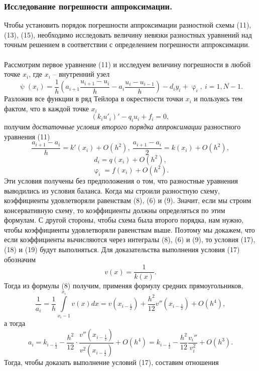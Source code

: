 \documentclass[a4paper, 12pt]{report}
\numberwithin{equation}{section}
\renewcommand{\varphi}{\upvarphi}
\renewcommand{\psi}{\uppsi}
\begin{document}
		\subsubsection{Исследование погрешности аппроксимации.}
		Чтобы установить порядок погрешности аппроксимации разностной схемы (11), (13), (15), необходимо исследовать величину невязки разностных уравнений над точным решением в соответствии с определением погрешности аппроксимации.\\\\
		Рассмотрим первое уравнение (11) и исследуем величину погрешности в любой точке $x_i$, где $x_i$ -- внутренний узел
		$$\psi(x_i) = 	\dfrac{1}{h}\left(a_{i+1}\dfrac{u_{i+1} - u_i}{h} - a_i \dfrac{u_i - u_{i-1}}{h}\right)-d_iy_i + \varphi_i,\ i = \overline {1, N-1}.$$
		Разложив все функции в ряд Тейлора в окрестности точки $x_i$ и пользуясь тем фактом, что в каждой точке $x_i$
		$$(k_i u'_i)' - q_i u_i + f_i = 0,$$
		получим \textit{достаточные условия второго порядка аппроксимации} разностного уравнения (11)
		\begin{equation}
			\dfrac{a_{i+1} - a_i}{h} = k'(x_i) + O(h^2),\ \dfrac{a_{i+1} - a_i}{2} = k(x_i) + O(h^2),
		\end{equation}
		\begin{equation}
			d_i = q(x_i) + O(h^2),
		\end{equation}
		\begin{equation}
			\varphi_i = f(x_i) + O(h^2).
		\end{equation}
		Эти условия получены без предположения о том, что разностные уравнения выводились из условия баланса. Когда мы строили разностную схему, коэффициенты удовлетворяли равенствам (8), (6) и (9). Значит, если мы строим консервативную схему, то коэффициенты должны определяться по этим формулам. С другой стороны, чтобы схема была второго порядка, нам нужно, чтобы коэффициенты удовлетворяли равенствам выше. Поэтому мы докажем, что если коэффициенты вычисляются через интегралы (8), (6) и (9), то условия (17), (18) и (19) будут выполняться. Для доказательства выполнения условия (17) обозначим $$v(x) = \dfrac 1{k(x)}.$$
		Тогда из формулы (8) получим, применяя формулу средних прямоугольников,
		$$\dfrac 1 {a_i} = \dfrac 1h \int\limits_{x_i-1}^{x_i}v(x)dx = v(x_{i-\frac 12}) + \dfrac {h^2}{12}v''(x_{i-\frac 12}) + O(h^4),$$
		а тогда
		$$a_i = k_{i-\frac 12}-\dfrac {h^2}{12}
		\cdot \dfrac {v''(x_{i-\frac12})}{v^2(x_{i-\frac12})} + O(h^4) = k_{i - \frac 12} - \dfrac{h^2}{12} \dfrac{v_i''}{v_i^2} + O(h^3).$$
		Тогда, чтобы доказать выполнение условий (17), составим отношения
\end{document}
